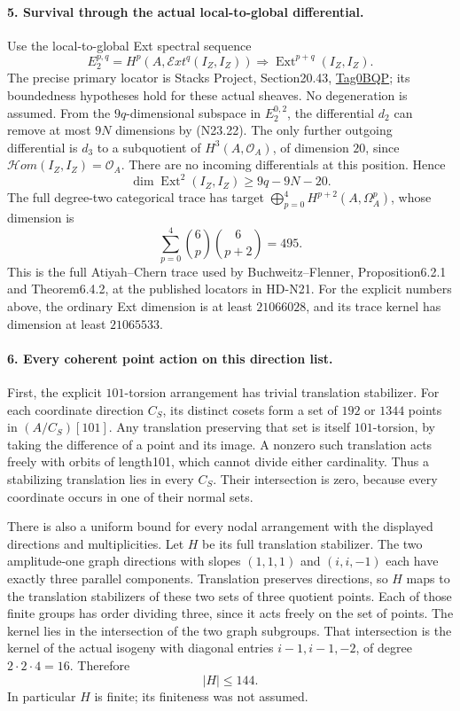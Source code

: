 \paragraph{5. Survival through the actual local-to-global differential.}
Use the local-to-global Ext spectral sequence
\[
 E_2^{p,q}=H^p(A,\mathcal E xt^q(I_Z,I_Z))
                       \Longrightarrow\operatorname{Ext}^{p+q}(I_Z,I_Z).
                                                               \tag{N23.24}
\]
The precise primary locator is Stacks Project, Section20.43,
\href{https://stacks.math.columbia.edu/tag/0BQP}{Tag0BQP};
its boundedness hypotheses hold for these actual sheaves.
No degeneration is assumed. From the $9q$-dimensional subspace
in $E_2^{0,2}$, the differential $d_2$ can remove at most $9N$
dimensions by (N23.22). The only further outgoing differential
is $d_3$ to a subquotient of $H^3(A,\mathcal O_A)$, of dimension
$20$, since $\mathcal H om(I_Z,I_Z)=\mathcal O_A$.
There are no incoming differentials at this position. Hence
\[
            \dim\operatorname{Ext}^2(I_Z,I_Z)\ge9q-9N-20.
                                                               \tag{N23.25}
\]
The full degree-two categorical trace has target
$\bigoplus_{p=0}^4H^{p+2}(A,\Omega_A^p)$, whose dimension is
\[
                  \sum_{p=0}^4\binom6p\binom6{p+2}=495.     \tag{N23.26}
\]
This is the full Atiyah--Chern trace used by
Buchweitz--Flenner, Proposition6.2.1 and Theorem6.4.2, at the
published locators in HD-N21. For the explicit numbers above,
the ordinary Ext dimension is at least $21066028$, and its
trace kernel has dimension at least $21065533$.

\paragraph{6. Every coherent point action on this direction list.}
First, the explicit $101$-torsion arrangement has trivial
translation stabilizer. For each coordinate direction $C_S$,
its distinct cosets form a set of $192$ or $1344$ points in
$(A/C_S)[101]$. Any translation preserving that set is itself
$101$-torsion, by taking the difference of a point and its image.
A nonzero such translation acts freely with orbits of length101,
which cannot divide either cardinality. Thus a stabilizing
translation lies in every $C_S$. Their intersection is zero,
because every coordinate occurs in one of their normal sets.

There is also a uniform bound for every nodal arrangement with
the displayed directions and multiplicities. Let $H$ be its
full translation stabilizer. The two amplitude-one graph
directions with slopes $(1,1,1)$ and $(i,i,-1)$ each have exactly
three parallel components. Translation preserves directions,
so $H$ maps to the translation stabilizers of these two sets
of three quotient points. Each of those finite groups has order
dividing three, since it acts freely on the set of points.
The kernel lies in the intersection of the two graph subgroups.
That intersection is the kernel of the actual isogeny with
diagonal entries $i-1,i-1,-2$, of degree $2\cdot2\cdot4=16$.
Therefore
\[
                              |H|\le144.                    \tag{N23.27}
\]
In particular $H$ is finite; its finiteness was not assumed.

